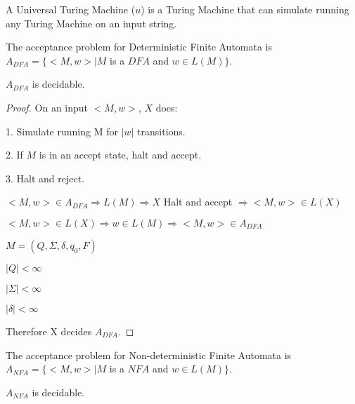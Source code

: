 \begin{definition}
    A Universal Turing Machine ($\mathit{u}$) is a Turing Machine that can simulate running any Turing Machine on an input string.
\end{definition}

\pagebreak

    \begin{definition}
        The acceptance problem for Deterministic Finite Automata is $A_{DFA}=\{<M,w> | M$ is a $DFA$ and $w\in L(M)\}$.
    \end{definition}

    \begin{theorem}
        $A_{DFA}$ is decidable.
    \end{theorem}

    \begin{proof}
        On an input $<M,w>$, $X$ does:

        1. Simulate running M for $|w|$ transitions.

        2. If $M$ is in an accept state, halt and accept.
        
        3. Halt and reject.

        $<M,w>\in A_{DFA} \Rightarrow L(M) \Rightarrow X$ Halt and accept $\Rightarrow <M,w>\in L(X)$

        $<M,w>\in L(X) \Rightarrow w\in L(M) \Rightarrow <M,w>\in A_{DFA}$

        $M=(Q,\Sigma, \delta, q_0, F)$

            $|Q|<\infty$

            $|\Sigma|<\infty$

            $|\delta|<\infty$

        Therefore X decides $A_{DFA}$.
    \end{proof}

    \begin{definition}
        The acceptance problem for Non-deterministic Finite Automata is $A_{NFA}=\{<M,w> | M$ is a $NFA$ and $w\in L(M)\}$.
    \end{definition}

    \begin{theorem}
        $A_{NFA}$ is decidable.
    \end{theorem}

